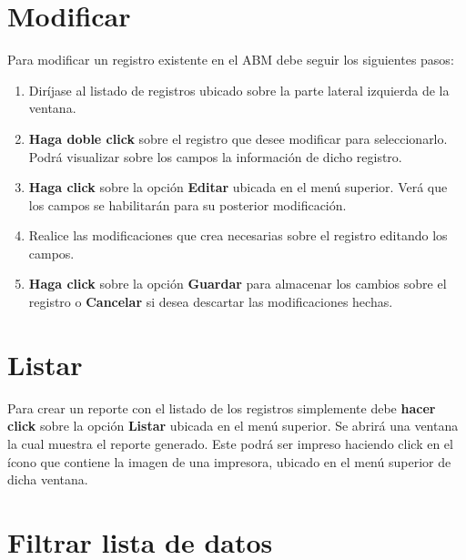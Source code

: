\documentclass{book}
\begin{document}
\section{Modificar}


Para modificar un registro existente en el ABM debe seguir los siguientes pasos:
\medskip

\begin{enumerate}
	\itemsep=8pt \topsep=0pt \partopsep=0pt \parskip=0pt \parsep=0pt
	
	\item Diríjase al listado de registros ubicado sobre la parte lateral izquierda de la ventana.

	\item \textbf{Haga doble click} sobre el registro que desee modificar para seleccionarlo. Podrá visualizar sobre los campos la información de dicho registro.

	\item \textbf{Haga click} sobre la opción \textbf{Editar} ubicada en el menú superior. Verá que los campos se habilitarán para su posterior modificación.

	\item Realice las modificaciones que crea necesarias sobre el registro editando los campos.

	\item \textbf{Haga click} sobre la opción \textbf{Guardar} para almacenar los cambios sobre el registro o \textbf{Cancelar} si desea descartar las modificaciones hechas.

\end{enumerate}
\medskip


\section{Listar}

Para crear un reporte con el listado de los registros simplemente debe \textbf{hacer click} sobre la opción \textbf{Listar} ubicada en el menú superior. Se abrirá una ventana la cual muestra el reporte generado. Este podrá ser impreso haciendo click en el ícono que contiene la imagen de una impresora, ubicado en el menú superior de dicha ventana.
\bigskip


\section{Filtrar lista de datos}
\end{document}
